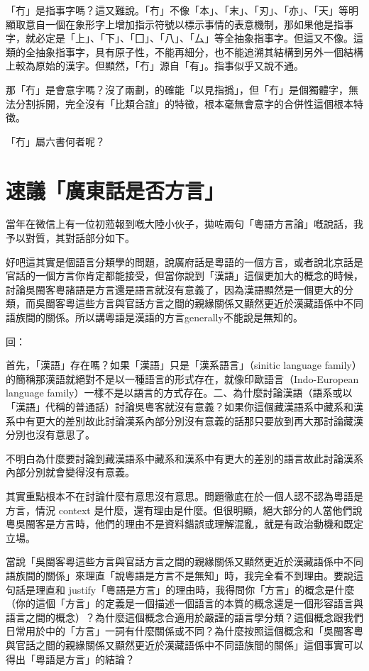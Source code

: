 「冇」是指事字嗎？這又難說。「冇」不像「本」、「末」、「刃」、「亦」、「天」等明顯取意自一個在象形字上增加指示符號以標示事情的表意機制，那如果他是指事字，就必定是「上」、「下」、「囗」、「八」、「厶」等全抽象指事字。但這又不像。這類的全抽象指事字，具有原子性，不能再細分，也不能追溯其結構到另外一個結構上較為原始的漢字。但顯然，「冇」源自「有」。指事似乎又說不通。

那「冇」是會意字嗎？沒了兩劃，的確能「以見指撝」，但「冇」是個獨體字，無法分割拆開，完全沒有「比類合誼」的特徵，根本毫無會意字的合併性這個根本特徵。

「冇」屬六書何者呢？

\section{速議「廣東話是否方言」}
當年在微信上有一位初蒞報到嘅大陸小伙子，拋咗兩句「粵語方言論」嘅說話，我予以對質，其對話部分如下。

好吧這其實是個語言分類學的問題，說廣府話是粵語的一個方言，或者說北京話是官話的一個方言你肯定都能接受，但當你說到「漢語」這個更加大的概念的時候，討論吳閩客粵諸語是方言還是語言就沒有意義了，因為漢語顯然是一個更大的分類，而吳閩客粵這些方言與官話方言之間的親緣關係又顯然更近於漢藏語係中不同語族間的關係。所以講粵語是漢語的方言generally不能說是無知的。

回：

首先，「漢語」存在嗎？如果「漢語」只是「漢系語言」（sinitic language family）的簡稱那漢語就絕對不是以一種語言的形式存在，就像印歐語言（Indo-European language family）一樣不是以語言的方式存在。二、為什麼討論漢語（語系或以「漢語」代稱的普通話）討論吳粵客就沒有意義？如果你這個藏漢語系中藏系和漢系中有更大的差別故此討論漢系內部分別沒有意義的話那只要放到再大那討論藏漢分別也沒有意思了。

不明白為什麼要討論到藏漢語系中藏系和漢系中有更大的差別的語言故此討論漢系內部分別就會變得沒有意義。

其實重點根本不在討論什麼有意思沒有意思。問題徹底在於一個人認不認為粵語是方言，情況 context 是什麼，還有理由是什麼。但很明顯，絕大部分的人當他們說粵吳閩客是方言時，他們的理由不是資料錯誤或理解混亂，就是有政治動機和既定立場。

當說「吳閩客粵這些方言與官話方言之間的親緣關係又顯然更近於漢藏語係中不同語族間的關係」來理直「說粵語是方言不是無知」時，我完全看不到理由。要說這句話是理直和 justify「粵語是方言」的理由時，我得問你「方言」的概念是什麼（你的這個「方言」的定義是一個描述一個語言的本質的概念還是一個形容語言與語言之間的概念）？為什麼這個概念合適用於嚴謹的語言學分類？這個概念跟我們日常用於中的「方言」一詞有什麼關係或不同？為什麼按照這個概念和「吳閩客粵與官話之間的親緣關係又顯然更近於漢藏語係中不同語族間的關係」這個事實可以得出「粵語是方言」的結論？

